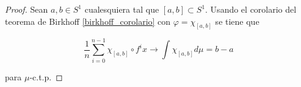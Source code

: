 \begin{proof}
	Sean $a,b \in S^1$ cualesquiera tal que $[a,b] \subset S^1$. Usando el corolario del teorema de Birkhoff \ref{birkhoff_corolario} con $\varphi = \chi_{[a,b]}$ se tiene que
	
	\begin{equation}
		\frac{1}{n} \sum_{i=0}^{n-1} \chi_{[a,b]} \circ f^i x \rightarrow \int \chi_{[a,b]} d\mu = b-a
	\end{equation}
	
	para $\mu$-c.t.p.
\end{proof}